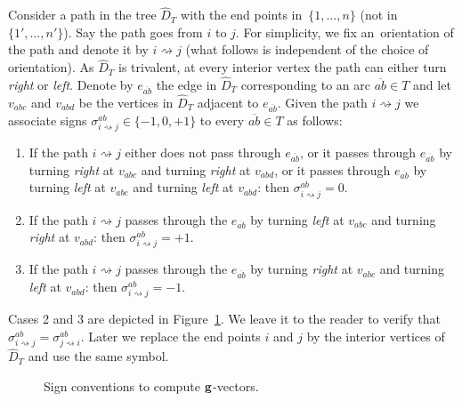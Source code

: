 \documentclass[10pt,a4paper]{amsart}
\numberwithin{equation}{section}
\begin{document}
Consider a path in the tree $\widehat D_T$ with the end points in~$\{1,\dots,n\}$ (not in~$\{1',\dots,n'\}$).
Say the path goes from $i$ to $j$.
For simplicity, we fix an~ori\-en\-tation of the path and denote it by $i\rightsquigarrow j$ (what follows is independent of the choice of orientation).
As $\widehat D_T$ is trivalent, at every interior vertex the path can either turn \emph{right} or \emph{left}.
Denote by $e_{\overline{ab}}$ the edge in $\widehat{D}_T$ corresponding to an arc $\overline{ab}\in T$ and let $v_{abc}$ and $v_{abd}$ be the vertices in $\widehat{D}_T$ adjacent to $e_{\overline{ab}}$.
Given the path $i\rightsquigarrow j$ we associate signs $\sigma_{i\rightsquigarrow j}^{ab}\in \{-1,0,+1\}$ to every $\overline{ab}\in T$ as follows:
\begin{enumerate}\itemsep=0pt
 \item
 If the path $i\rightsquigarrow j$ either does not pass through $e_{\overline{ab}}$, or it passes through $e_{\overline{ab}}$ by turning \emph{right} at $v_{abc}$ and turning \emph{right} at $v_{abd}$, or it passes through $e_{\overline{ab}}$ by turning \emph{left} at $v_{abc}$ and turning \emph{left} at $v_{abd}$: then
 $\sigma_{i\rightsquigarrow j}^{{ab}}=0$.
 \item If the path $i\rightsquigarrow j$ passes through the $e_{\overline{ab}}$ by turning \emph{left} at $v_{abc}$ and turning \emph{right} at $v_{abd}$: then $\sigma_{i\rightsquigarrow j}^{{ab}}=+1$.
 \item If the path $i\rightsquigarrow j$ passes through the $e_{\overline{ab}}$ by turning \emph{right} at $v_{abc}$ and turning \emph{left} at $v_{abd}$: then $\sigma_{i\rightsquigarrow j}^{{ab}}=-1$.
\end{enumerate}

Cases 2 and 3 are depicted in Figure~\ref{fig:sign g-v}. We leave it to the reader to verify that $\sigma_{i\rightsquigarrow j}^{{ab}}=\sigma_{j\rightsquigarrow i}^{{ab}}$.
Later we replace the end points $i$ and $j$ by the interior vertices of $\widehat{D}_T$ and use the same symbol.

\begin{figure}[ht]
 \centering
{}
 \caption{Sign conventions to compute ${\bf g}$-vectors.}
 \label{fig:sign g-v}
\end{figure}
\end{document}
